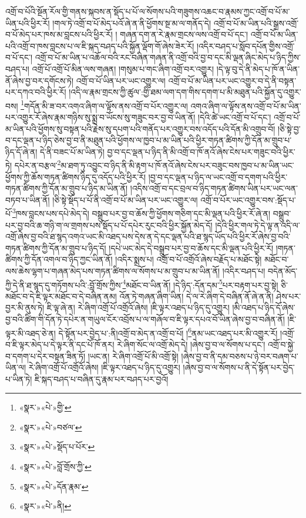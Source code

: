 འགྲོ་བ་པོའི་སྔོན་རོལ་གྱི་གནས་སྐབས་ན་སྡོད་པ་པོ་ལ་སོགས་པའི་གཟུགས་འཆང་བ་རྣམས་ཀྱང་འགྲོ་བ་པོ་མ་ཡིན་པའི་ཕྱིར་རོ། །གལ་ཏེ་འགྲོ་བ་པོ་མེད་པའོ་ཞེ་ན་ནི་ཕྱོགས་སྔ་མ་ལ་གནོད་དེ། འགྲོ་བ་པོ་མ་ཡིན་པའི་སྒྲས་འགྲོ་བ་པོ་མེད་པར་ཁས་མ་བླངས་པའི་ཕྱིར་རོ། །
གཞན་དག་ན་རེ་རྣམ་གྲངས་ལས་འགྲོ་བ་པོ་དང་། འགྲོ་བ་པོ་མ་ཡིན་པའི་འགྲོ་བ་ཁས་བླངས་པ་ལ་ཇི་སྐད་བཤད་པའི་སྐྱོན་ལྡོག་གོ་ཞེས་ཟེར་རོ། །འདིར་བཤད་པ་སློབ་དཔོན་གྱིས་འགྲོ་བ་པོ་དང་། འགྲོ་བ་པོ་མ་ཡིན་པ་འཆོལ་བའི་རང་བཞིན་གཞན་ནི་འགྲོ་བའི་བྱ་བ་དང་མི་ལྡན་ཞིང་མེད་པ་ཉིད་ཀྱིས་བཤད་པ། འགྲོ་པོ་འགྲོ་པོ་མིན་ལས་གཞན། །གསུམ་པ་གང་ཞིག་འགྲོ་བར་འགྱུར། །དེ་ལྟ་བུ་དེ་ནི་མེད་པ་ཁོ་ན་ཡིན་ནོ་ཞེས་བྱ་བར་དགོངས་ཏེ། འགྲོ་བ་པོ་ཡིན་པར་ཡང་འགྱུར་ལ། འགྲོ་བ་པོ་མ་ཡིན་པར་ཡང་འགྱུར་བ་དེ་ནི་བསྟན་པར་དཀའ་བའི་ཕྱིར་རོ། །འདི་ལ་རྣམ་གྲངས་ཀྱི་ཚུལ་:གྱི་ཐམ་ལག་དག་གིས་དགག་པ་མི་མཐུན་པའི་སྐྱོན་དུ་འགྱུར་བས། \footnote{«སྣར་»«པེ་»གྱི་}གདོན་མི་ཟ་བར་འགའ་ཞིག་ལ་ལྟོས་ནས་འགྲོ་བ་པོར་འགྱུར་ལ། འགའ་ཞིག་ལ་ལྟོས་ནས་འགྲོ་བ་པོ་མ་ཡིན་པར་འགྱུར་རོ་ཞེས་རྣམ་གཉིས་སུ་སྨྲ་བ་ཡོངས་སུ་གཟུང་བར་བྱ་བ་ཡིན་ནོ། །དེའི་ཚེ་ཡང་འགྲོ་བ་པོ་དང་། འགྲོ་བ་པོ་མ་ཡིན་པའི་ཕྱོགས་སུ་བསྟན་པའི་རྗེས་སུ་དཔག་པའི་གནོད་པར་འགྱུར་བས་འདོད་པའི་དོན་མི་འགྲུབ་བོ། །ཅི་སྟེ་བྱ་བ་དང་ལྡན་པ་ཉིད་ཅེས་བྱ་བ་ནི་མཐུན་པའི་ཕྱོགས་ལ་ཁྱབ་པ་མ་ཡིན་པའི་ཕྱིར་གཏན་ཚིགས་ཀྱི་དོན་མ་གྲུབ་པ་ཉིད་དོ་ཞེ་ན། དེ་ནི་བཟང་པོ་མ་ཡིན་ཏེ། བྱ་བ་དང་ལྡན་པ་ཉིད་ནི་མི་འགྲོ་བ་ཁོ་ནའོ་ཞེས་ངེས་པར་གཟུང་བའི་ཕྱིར་ཏེ། དཔེར་ན་བརྩལ་\footnote{«སྣར་»«པེ་»བཙལ་}མ་ཐག་ཏུ་འབྱུང་བ་ཉིད་ནི་མི་རྟག་པ་ཁོ་ནའོ་ཞེས་ངེས་པར་བཟུང་བས་ཁྱབ་པ་མ་ཡིན་ཡང་ཕྱོགས་ཀྱི་ཆོས་གཏན་ཚིགས་ཉིད་དུ་འདོད་པའི་ཕྱིར་རོ། །བྱ་བ་དང་ལྡན་པ་ཉིད་ལ་ཡང་འགྲོ་བ་དགག་པའི་ཕྱིར་གཏན་ཚིགས་ཀྱི་དོན་མ་གྲུབ་པ་ཉིད་མ་ཡིན་ནོ། །འདིས་འགྲོ་བ་དང་བྲལ་བ་ཉིད་གཏན་ཚིགས་ཡིན་པར་ཡང་ལན་བཏབ་པ་ཡིན་ནོ། །ཅི་སྟེ་སྡོད་པ་པོ་ནི་འགྲོ་བ་པོ་མ་ཡིན་པར་ཡང་འགྱུར་ལ། འགྲོ་བ་པོར་ཡང་འགྱུར་བས་:སྡོད་པ་པོ་\footnote{«སྣར་»«པེ་»སྡོད་པ་པོར་}ཁས་བླངས་པས་དཔེ་མེད་དེ། བསྒྲུབ་པར་བྱ་བ་ཆོས་ཀྱི་ཕྱོགས་གཅིག་དང་མི་ལྡན་པའི་ཕྱིར་རོ་ཞེ་ན། བསྒྲུབ་པར་བྱ་བའི་ཆ་གཉི་ག་ལ་གྲགས་པས་སྡོད་པ་པོ་དཔེར་རུང་བའི་ཕྱིར་སྐྱོན་མེད་དོ། །དེའི་ཕྱིར་གལ་ཏེ་དེ་ལྟ་ན་འདི་ལ་འགྲོ་ཞེས་བྱ་བའི་ཐ་སྙད་འགའ་ཡང་མི་འཐད་པས་དེས་ན་དེ་དང་ལྡན་པའི་ཐ་སྙད་ཡོད་པའི་ཕྱིར་རོ་ཞེས་བྱ་བའི་གཏན་ཚིགས་ཀྱི་དོན་མ་གྲུབ་པ་ཉིད་དོ། །དཔེ་ཡང་མེད་དེ་བསྒྲུབ་པར་བྱ་བ་ཆོས་དང་མི་ལྡན་པའི་ཕྱིར་རོ། །གཏན་ཚིགས་ཀྱི་དོན་འགལ་བ་ཉིད་ཀྱང་ཡིན་ནོ། །འདིར་སྨྲས་པ། འགྲོ་བ་པོ་འགྲོའོ་ཞེས་བརྗོད་པ་མཐོང་སྟེ། མཐོང་བ་ལས་ཆེས་ལྷག་པ་གཞན་མེད་པས་གཏན་ཚིགས་ལ་སོགས་པ་མ་གྲུབ་པ་མ་ཡིན་ནོ། །འདིར་བཤད་པ། བདེན་མོད་ཀྱི་དེ་ནི་ཐ་སྙད་དུ་གཏོགས་པའི་:བློ་གྲོས་ཀྱིས་\footnote{«སྣར་»«པེ་»བློ་གྲོས་ཀྱི་}མཐོང་བ་ཡིན་ནོ། །དེ་ཉིད་:དོན་དམ་\footnote{«སྣར་»«པེ་»དོན་རྣམ་}པར་བརྟག་པར་བྱ་སྟེ། ཅི་མཐོང་བ་དེ་ཇི་ལྟར་མཐོང་བ་དེ་བཞིན་ནམ། འོན་ཏེ་གཞན་ཞིག་ཡིན། དེ་ལ་རེ་ཞིག་དེ་བཞིན་ནོ་ཞེ་ན་ནི། ཤེས་པར་བྱར་མི་ནུས་ཏེ། ཇི་ལྟ་ཞེ་ན། རེ་ཞིག་འགྲོ་པོ་འགྲོའོ་ཞེས། །ཇི་ལྟར་འཐད་པ་ཉིད་དུ་འགྱུར། །མི་འཐད་པ་ཉིད་དོ་ཞེས་བྱ་བའི་ཚིག་གི་དོན་ཏེ་དཔེར་ན་གཡུལ་ངོར་འབྲོས་པ་ལ་གཞོལ་བ་ཇི་ལྟར་དཔའ་བོ་ཡིན་ཞེས་བྱ་བ་བཞིན་ནོ། །ཇི་ལྟར་མི་འཐད་ཅེ་ན། དེ་སྟོན་པར་བྱེད་པ་:ནི།འགྲོ་བ་མེད་ན་འགྲོ་བ་པོ། །\footnote{«སྣར་»«པེ་»ནི།}ནམ་ཡང་འཐད་པར་མི་འགྱུར་རོ། །འགྲོ་བ་ཇི་ལྟར་མེད་པ་དེ་ལྟར་ནི་དང་པོ་ཁོ་ནར། རེ་ཞིག་སོང་ལ་འགྲོ་མེད་དེ། །ཞེས་བྱ་བ་ལ་སོགས་པ་དང་། འགྲོ་བ་སྐྱེ་བ་དགག་པ་དེར་བསྟན་ཟིན་ཏོ། །ཡང་ན། རེ་ཞིག་འགྲོ་པོ་མི་འགྲོ་སྟེ། །ཞེས་བྱ་བ་ནི་དམ་བཅས་པ་ཉེ་བར་བཞག་པ་ཡིན་ལ། རེ་ཞིག་འགྲོ་པོ་འགྲོའོ་ཞེས། །ཇི་ལྟར་འཐད་པ་ཉིད་དུ་འགྱུར། །ཞེས་བྱ་བ་ལ་སོགས་པ་ནི་དེ་སྟོན་པར་བྱེད་པ་ཡིན་ཏེ། ཇི་སྐད་བཤད་པ་བཞིན་དུ་རྣམ་པར་བཤད་པར་བྱའོ། 